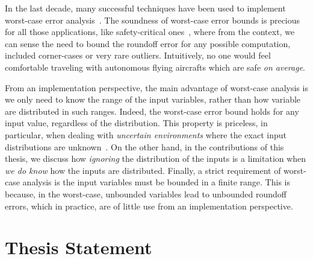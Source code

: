 In the last decade, many successful techniques have been used to implement worst-case error analysis~\cite{darulova2018daisy,2015_fm_sjrg,solovyev2018rigorous,rosa,fptuner,smartfloat,satire,gappa,fluctuat}.
%
%
The soundness of worst-case error bounds is precious for all those applications, like safety-critical ones~\cite{guardstable, cpralg}, where from the context, we can sense the need to bound the roundoff error for any possible computation, included corner-cases or very rare outliers.
%
Intuitively, no one would feel comfortable traveling with autonomous flying aircrafts which are safe \emph{on average}.

%
From an implementation perspective, the main advantage of worst-case analysis is we only need to know the range of the input variables, rather than how variable are distributed in such ranges. 
%
Indeed, the worst-case error bound holds for any input value, regardless of the distribution.
%
%
This property is priceless, in particular, when dealing with \emph{uncertain environments} where the exact input distributions are unknown~\cite{robotrisk}.
%
On the other hand, in the contributions of this thesis, we discuss how \emph{ignoring} the distribution of the inputs is a limitation when \emph{we do know} how the inputs are distributed.
%
Finally, a strict requirement of worst-case analysis is the input variables must be bounded  in a finite range. This is because, in the worst-case, unbounded variables lead to unbounded roundoff errors, which in practice, are of little use from an implementation perspective.
%
\section{Thesis Statement}
%

